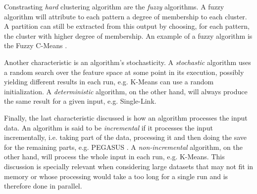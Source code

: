 Constrasting \emph{hard} clustering algorithm are the \emph{fuzzy} algorithms.
A fuzzy algorithm will attribute to each pattern a degree of membership to each cluster.
A partition can still be extracted from this output by choosing, for each pattern, the cluster with higher degree of membership.
An example of a fuzzy algorithm is the Fuzzy C-Means \cite{Bezdek1984}.

Another characteristic is an algorithm's stochasticity.
A \emph{stochastic} algorithm uses a random search over the feature space at some point in its execution, possibly yielding different results in each run, e.g. K-Means can use a random initialization.
A \emph{deterministic} algorithm, on the other hand, will always produce the same result for a given input, e.g. Single-Link.

Finally, the last characteristic discussed is how an algorithm processes the input data.
An algorithm is said to be \emph{incremental} if it processes the input incrementally, i.e. taking part of the data, processing it and then doing the save for the remaining parts, e.g. PEGASUS \cite{Kang2011}.
A \emph{non-incremental} algorithm, on the other hand, will process the whole input in each run, e.g. K-Means.
This discussion is specially relevant when considering large datasets that may not fit in memory or whose processing would take a too long for a single run and is therefore done in parallel.





